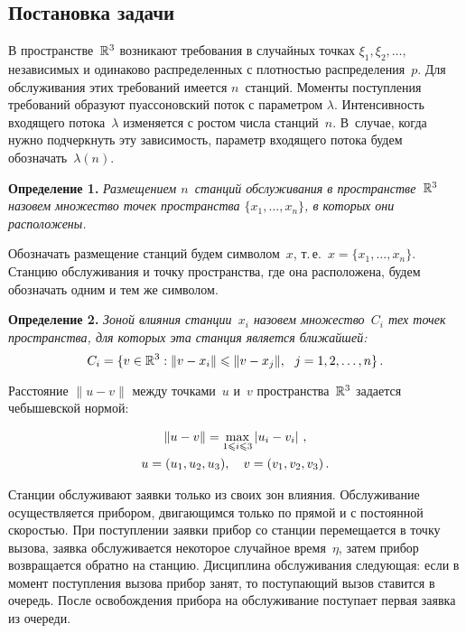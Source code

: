 \begin{multicols}{2}
\section{Постановка задачи}

В пространстве~${\mathbb{R}}^3$ возникают требования в случайных точках $\xi_1,\xi_2,\dots,$ независимых и
одинаково распределенных с плотностью распределения~$p$. Для обслуживания этих требований
имеется $n$~станций. Моменты поступления требований образуют пуассоновский поток с параметром
$\lambda$. Интенсивность входящего потока~$\lambda$ изменяется с ростом чис\-ла станций~$n$. 
В~случае, когда нужно подчеркнуть эту зависимость, параметр входящего потока будем обозначать~$\lambda(n)$.

\medskip

\noindent
\textbf{Определение 1.} \textit{Размещением $n$~станций обслуживания в пространстве~${\mathbb{R}}^3$ назовем
множество точек пространства $\{x_1,\ldots,x_n\}$, в которых они расположены.}

\medskip

Обозначать размещение станций будем символом~$x$, т.\,е.\ $x=\{x_1,\ldots,x_n\}$. Станцию
обслуживания и точку пространства, где она расположена, будем обозначать одним и тем же
символом.

\smallskip

\noindent
\textbf{Определение 2.} \textit{Зоной влияния станции~$x_i$ назовем множество~$C_i$ тех точек
пространства, для которых эта станция является ближайшей:
$$
C_i=\{v\in{\mathbb{R}}^3:\|v-x_i\|\leqslant\|v-x_j\|,~~ j=1,2,\ldots,n\}\,.
$$}

\vspace*{-3pt}

Расстояние $\|u-v\|$ между точками~$u$ и~$v$ пространства~${\mathbb{R}}^3$ задается чебышевской нормой:

\noindent
\begin{multline*}
\|u-v\|=\max\limits_{1\leqslant i\leqslant 3}\left|u_i-v_i\right|\,, \\
 u=(u_1,u_2,u_3), \quad v=(v_1,v_2,v_3)\,.
\end{multline*}

Станции обслуживают заявки только из своих зон влияния. Обслуживание осуществляется прибором,
двигающимся только по прямой и с постоянной скоростью. При поступлении заявки прибор со
станции перемещается в точку вызова, заявка обслуживается некоторое случайное время~$\eta$, 
затем прибор возвращается обратно на станцию. Дисциплина обслуживания
следующая: если в момент поступления вызова прибор занят, то поступающий вызов ставится в
очередь. После освобождения прибора на обслуживание поступает первая заявка из очереди.


\end{multicols}
